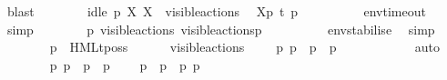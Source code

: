 \begin{isabellebody}
\ blast{\isacharplus}{\kern0pt}\isanewline
\isanewline
\ \ \ \ \ \ \isamarkupfalse%
\ {\isacartoucheopen}idle\ p\ X{\isacartoucheclose}\ {\isacartoucheopen}X\ {\isasymsubseteq}\ visible{\isacharunderscore}{\kern0pt}actions{\isacartoucheclose}\ \isamarkupfalse%
\ {\isacartoucheopen}{\isasymtheta}{\isacharbrackleft}{\kern0pt}X{\isacharbrackright}{\kern0pt}{\isacharparenleft}{\kern0pt}p{\isacharparenright}{\kern0pt}\ {\isasymlongmapsto}\isactrlsup {\isasymtheta}t{\isacharunderscore}{\kern0pt}{\isasymepsilon}\ {\isasymtheta}{\isacharparenleft}{\kern0pt}p{\isacharparenright}{\kern0pt}{\isacartoucheclose}\isanewline
\ \ \ \ \ \ \ \ \isamarkupfalse%
\ env{\isacharunderscore}{\kern0pt}timeout\ \isamarkupfalse%
\ simp\isanewline
\ \ \ \ \ \ \isamarkupfalse%
\ {\isacartoucheopen}{\isasymtheta}{\isacharparenleft}{\kern0pt}p{\isacharparenright}{\kern0pt}\ {\isasymlongmapsto}\isactrlsup {\isasymtheta}{\isasymepsilon}{\isacharbrackleft}{\kern0pt}visible{\isacharunderscore}{\kern0pt}actions{\isacharbrackright}{\kern0pt}\ {\isasymtheta}{\isacharbrackleft}{\kern0pt}visible{\isacharunderscore}{\kern0pt}actions{\isacharbrackright}{\kern0pt}{\isacharparenleft}{\kern0pt}p{\isacharparenright}{\kern0pt}{\isacartoucheclose}\isanewline
\ \ \ \ \ \ \ \ \isamarkupfalse%
\ env{\isacharunderscore}{\kern0pt}stabilise\ \isamarkupfalse%
\ simp\isanewline
\isanewline
\ \ \ \ \ \ \isamarkupfalse%
\ {\isacartoucheopen}p\ {\isasymTTurnstile}\ HMLt{\isacharunderscore}{\kern0pt}poss\ {\isasymalpha}\ {\isasymphi}{\isacartoucheclose}\ \isamarkupfalse%
\ {\isacartoucheopen}{\isasymalpha}\ {\isasymin}\ visible{\isacharunderscore}{\kern0pt}actions\ {\isasymor}\ {\isasymalpha}\ {\isacharequal}{\kern0pt}\ {\isasymtau}{\isacartoucheclose}\ {\isacartoucheopen}{\isasymexists}p{\isacharprime}{\kern0pt}{\isachardot}{\kern0pt}\ p\ {\isasymlongmapsto}{\isasymalpha}\ p{\isacharprime}{\kern0pt}\ {\isasymand}\ p{\isacharprime}{\kern0pt}\ {\isasymTTurnstile}\ {\isasymphi}{\isacartoucheclose}\isanewline
\ \ \ \ \ \ \ \ \isamarkupfalse%
\ auto\isanewline
\ \ \ \ \ \ \isamarkupfalse%
\ {\isacartoucheopen}{\isasymexists}p{\isacharprime}{\kern0pt}{\isachardot}{\kern0pt}\ p\ {\isasymlongmapsto}{\isasymalpha}\ p{\isacharprime}{\kern0pt}\ {\isasymand}\ p{\isacharprime}{\kern0pt}\ {\isasymTTurnstile}\ {\isasymphi}{\isacartoucheclose}\ \isamarkupfalse%
\ p{\isacharprime}{\kern0pt}\ \ {\isacartoucheopen}p\ {\isasymlongmapsto}{\isasymalpha}\ p{\isacharprime}{\kern0pt}{\isacartoucheclose}\ {\isacartoucheopen}p{\isacharprime}{\kern0pt}\ {\isasymTTurnstile}\ {\isasymphi}{\isacartoucheclose}\ \isamarkupfalse%

\end{isabellebody}

